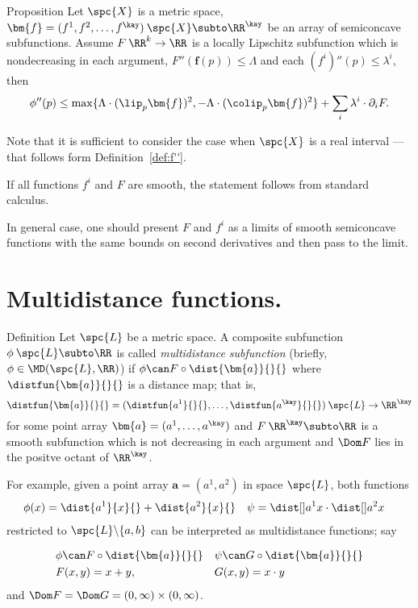 \begin{thm}{Proposition}\label{prop:composite+convex}
Let $\spc{X}$ is a metric space,
$\bm{f}=(f^1,f^2,\dots,f^\kay)\:\spc{X}\subto\RR^\kay$
be an array of semiconcave subfunctions.
Assume $F\:\RR^k\to\RR$ is a locally Lipschitz subfunction which is nondecreasing in each argument,
$F''(\bm{f}(p))\le \Lambda$  
and each $(f^i)''(p)\le \lambda^i$, 
then
\[
\phi''(p)
\le
\max
\{\Lambda\cdot(\lip_p\bm{f})^2,-\Lambda\cdot(\colip_p\bm{f})^2\}
+\sum_i\lambda^i\cdot\partial_iF.
\]
\end{thm}

Note that it is sufficient to consider the case when $\spc{X}$ is a real interval 
--- that follows form Definition~\ref{def:f''}.

If all functions $f^i$ and $F$ are smooth,
the statement follows from standard calculus.

In general case, one should present $F$ and $f^i$ as a limits of smooth semiconcave functions with the same bounds on second derivatives and then pass to the limit.
\qeds

\section{Multidistance functions.}

\begin{thm}{Definition}\label{def:MD}
Let $\spc{L}$ be a metric space.
A composite  subfunction $\phi\:\spc{L}\subto\RR$ is called \emph{multidistance subfunction}%
(briefly, $\phi\in \MD(\spc{L},\RR)$) 
if
$\phi\can F\circ\dist{\bm{a}}{}{}$ 
where $\distfun{\bm{a}}{}{}$ is a distance map; that is,
\[
\distfun{\bm{a}}{}{}
=
(\distfun{a^1}{}{},\dots,\distfun{a^\kay}{}{})\:\spc{L}\to\RR^\kay
\]
for some point array $\bm{a}=(a^1,\dots,a^\kay)$ and 
$F\:\RR^\kay\subto\RR$ is a smooth subfunction
which is not decreasing in each argument
and 
$\Dom F$
lies in the positve octant of $\RR^\kay$.
\end{thm}

For example, 
given a point array $\bm{a}=(a^1,a^2)$ in space $\spc{L}$,
both functions 
\begin{align*}
\phi(x)&=\dist{a^1}{x}{}+\dist{a^2}{x}{}
&
\psi&=\dist[{{}}]{a^1}{x}{}\cdot\dist[{{}}]{a^2}{x}{}
\end{align*}
 restricted to $\spc{L}\backslash \{a,b\}$ 
can be interpreted as multidistance functions;
say

\begin{align*}
&\phi\can F\circ\dist{\bm{a}}{}{}
&
&\psi\can G\circ\dist{\bm{a}}{}{}
\\
&F(x,y)=x+y, 
&
&G(x,y)=x\cdot y
\end{align*}
and $\Dom F=\Dom G=(0,\infty)\times(0,\infty)$.

